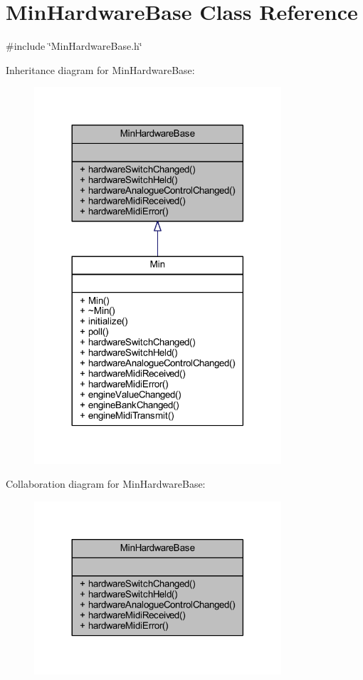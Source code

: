 \hypertarget{class_min_hardware_base}{}\section{Min\+Hardware\+Base Class Reference}
\label{class_min_hardware_base}


{\ttfamily \#include \char`\"{}Min\+Hardware\+Base.\+h\char`\"{}}



Inheritance diagram for Min\+Hardware\+Base\+:
\nopagebreak
\begin{figure}[H]
\begin{center}
\leavevmode
\includegraphics[width=260pt]{dd/d56/class_min_hardware_base__inherit__graph}
\end{center}
\end{figure}


Collaboration diagram for Min\+Hardware\+Base\+:
\nopagebreak
\begin{figure}[H]
\begin{center}
\leavevmode
\includegraphics[width=260pt]{df/de5/class_min_hardware_base__coll__graph}
\end{center}
\end{figure}

